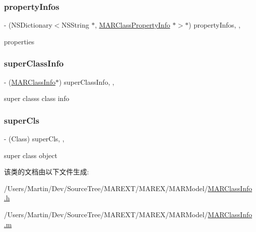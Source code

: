 \mbox{\label{interface_m_a_r_class_info_ad6eea0f70236be40b9f8fc620b25c7cb}} 
\subsubsection{\texorpdfstring{property\+Infos}{propertyInfos}}
{\footnotesize\ttfamily -\/ (N\+S\+Dictionary$<$N\+S\+String $\ast$, \hyperlink{interface_m_a_r_class_property_info}{M\+A\+R\+Class\+Property\+Info} $\ast$$>$$\ast$) property\+Infos\hspace{0.3cm}{\ttfamily [read]}, {\ttfamily [nonatomic]}, {\ttfamily [strong]}}



properties 

\mbox{\label{interface_m_a_r_class_info_a3066f3eb80f0c9157f4b9795ddfad63d}} 
\subsubsection{\texorpdfstring{super\+Class\+Info}{superClassInfo}}
{\footnotesize\ttfamily -\/ (\hyperlink{interface_m_a_r_class_info}{M\+A\+R\+Class\+Info}$\ast$) super\+Class\+Info\hspace{0.3cm}{\ttfamily [read]}, {\ttfamily [nonatomic]}, {\ttfamily [strong]}}



super class\textquotesingle{}s class info 

\mbox{\label{interface_m_a_r_class_info_aae66c24be2e8646387d12d4960f67a4e}} 
\subsubsection{\texorpdfstring{super\+Cls}{superCls}}
{\footnotesize\ttfamily -\/ (Class) super\+Cls\hspace{0.3cm}{\ttfamily [read]}, {\ttfamily [nonatomic]}, {\ttfamily [assign]}}



super class object 



该类的文档由以下文件生成\+:\begin{DoxyCompactItemize}
\item 
/\+Users/\+Martin/\+Dev/\+Source\+Tree/\+M\+A\+R\+E\+X\+T/\+M\+A\+R\+E\+X/\+M\+A\+R\+Model/\hyperlink{_m_a_r_class_info_8h}{M\+A\+R\+Class\+Info.\+h}\item 
/\+Users/\+Martin/\+Dev/\+Source\+Tree/\+M\+A\+R\+E\+X\+T/\+M\+A\+R\+E\+X/\+M\+A\+R\+Model/\hyperlink{_m_a_r_class_info_8m}{M\+A\+R\+Class\+Info.\+m}\end{DoxyCompactItemize}
